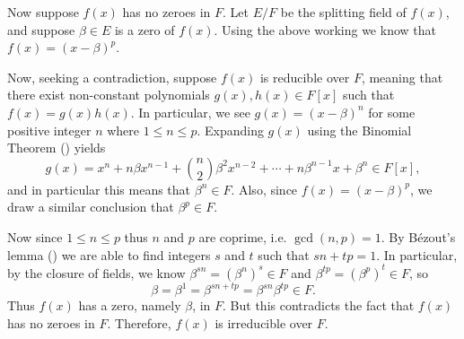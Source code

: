 \begin{questions}
    Now suppose $f(x)$ has no zeroes in $F$. Let $E/F$ be the splitting field of $f(x)$, and suppose $\beta \in E$ is a zero of $f(x)$. Using the above working we know that $f(x) = (x-\beta)^p$.

    Now, seeking a contradiction, suppose $f(x)$ is reducible over $F$, meaning that there exist non-constant polynomials $g(x), h(x) \in F[x]$ such that $f(x) = g(x)h(x)$. In particular, we see $g(x) = (x-\beta)^n$ for some positive integer $n$ where $1 \leq n \leq p$. Expanding $g(x)$ using the Binomial Theorem () yields
    \[
        g(x) = x^n + n\beta x^{n-1} + {n\choose2}\beta^2x^{n-2} + \cdots + n\beta^{n-1}x + \beta^n \in F[x],
    \]
    and in particular this means that $\beta^n \in F$. Also, since $f(x) = (x-\beta)^p$, we draw a similar conclusion that $\beta^p \in F$.

    Now since $1 \leq n \leq p$ thus $n$ and $p$ are coprime, i.e. $\gcd(n,p) = 1$. By B\'ezout's lemma () we are able to find integers $s$ and $t$ such that $sn + tp = 1$. In particular, by the closure of fields, we know $\beta^{sn} = \left(\beta^n\right)^s \in F$ and $\beta^{tp} = \left(\beta^p\right)^t \in F$, so
    \[
        \beta = \beta^1 = \beta^{sn+tp} = \beta^{sn}\beta^{tp} \in F.
    \]
    Thus $f(x)$ has a zero, namely $\beta$, in $F$. But this contradicts the fact that $f(x)$ has no zeroes in $F$. Therefore, $f(x)$ is irreducible over $F$.
\end{questions}
